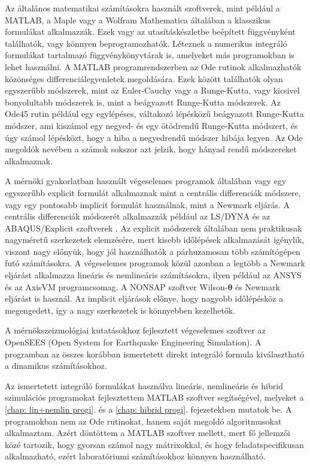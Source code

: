 Az általános matematikai számításokra használt szoftverek, mint például a MATLAB, a Maple vagy a Wolfram Mathematica általában a klasszikus formulákat alkalmazzák. Ezek vagy az utasításkészletbe beépített  függvényként találhatók, vagy könnyen beprogramozhatók. Léteznek a numerikus integráló formulákat tartalmazó függvénykönyvtárak is, amelyeket más programokban is lehet használni. A MATLAB programrendszerben az Ode rutinok alkalmazhatók közönséges differenciálegyenletek megoldására. Ezek között találhatók olyan egyszerűbb  módszerek, mint az Euler-Cauchy vagy a Runge-Kutta, vagy kicsivel bonyolultabb módszerek is, mint a beágyazott Runge-Kutta módszerek. Az Ode45 rutin például egy egylépéses, váltakozó lépésközű  beágyazott Runge-Kutta módszer, ami kiszámol egy negyed- és egy ötödrendű Runge-Kutta módszert, és úgy számol lépésközt, hogy a hiba a negyedrendű módszer hibája legyen. Az Ode megoldók nevében a számok sokszor azt jelzik, hogy hányad rendű módszereket alkalmaznak. 

A mérnöki gyakorlatban használt végeselemes programok általában vagy egy egyszerűbb explicit formulát alkalmaznak mint a centrális differenciák módszere, vagy egy pontosabb implicit formulát használnak, mint a Newmark eljárás. A centrális differenciák módszerét alkalmazzák például az LS/DYNA és az ABAQUS/Explicit szoftverek \cite{chopra}. Az explicit módszerek általában nem praktikusak nagyméretű szerkezetek elemzésére, mert  kisebb időlépések alkalmazását igénylik, viszont nagy előnyük, hogy jól használhatók a párhuzamosan több számítógépen futó számításokra. A végeselemes programok közül  azonban a legtöbb  a Newmark eljárást alkalmazza lineáris és nemlineáris számításokra, ilyen például az ANSYS és az AxisVM programcsomag. A NONSAP szoftver Wilson-$\boldsymbol\theta$ és Newmark eljárást is használ. Az implicit eljárások előnye, hogy nagyobb időlépésköz a megengedett, így a  nagy szerkezetek is könnyebben kezelhetők.

A mérnökszeizmológiai kutatásokhoz fejlesztett   végeselemes  szoftver  az OpenSEES (Open System for Earthquake Engineering Simulation). A programban az összes korábban ismertetett direkt integráló formula kiválasztható a dinamikus számításokhoz.

Az ismertetett integráló formulákat használva lineáris, nemlineáris és hibrid szimulációs programokat fejlesztettem MATLAB szoftver segítségével, melyeket a \ref{chap: lin+nemlin progi}. és a \ref{chap: hibrid progi}. fejezetekben mutatok be. A programokban nem  az Ode rutinokat, hanem saját megoldó algoritmusokat alkalmaztam. Azért döntöttem a MATLAB szoftver  mellett, mert fő jellemzői közé tartozik, hogy gyorsan számol nagy mátrixokkal, és hogy feladatspecifikusan alkalmazható, ezért laboratóriumi számításokhoz könnyen használható.

